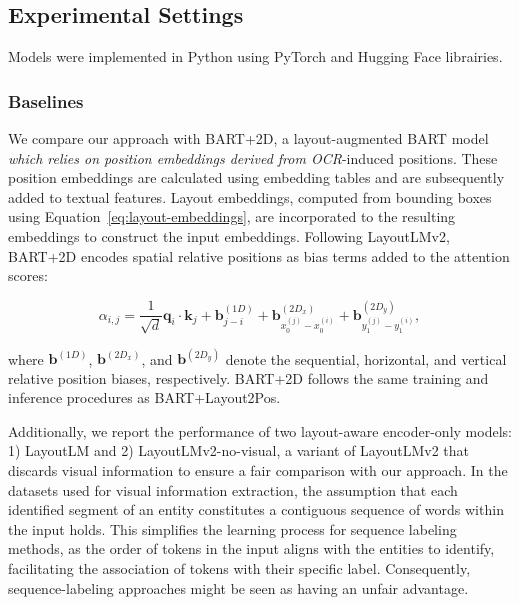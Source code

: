 \subsection{Experimental Settings}

Models were implemented in Python using PyTorch \citep{paszke2017automatic} and Hugging Face \citep{wolf2019huggingface} librairies. 

\subsubsection{Baselines}

We compare our approach with BART+2D, a layout-augmented \ac{BART} model \textit{which relies on position embeddings derived from \ac{OCR}}-induced positions. These position embeddings are calculated using embedding tables \citep{devlin2018bert} and are subsequently added to textual features. Layout embeddings, computed from bounding boxes using Equation~\ref{eq:layout-embeddings}, are incorporated to the resulting embeddings to construct the input embeddings. Following LayoutLMv2, BART+2D encodes spatial relative positions as bias terms added to the attention scores:

\begin{equation}
  \alpha_{i,j} = \dfrac{1}{\sqrt{d}} \bm{q}_i \cdot \bm{k}_j + \bm{b}^{(1D)}_{j - i} + \bm{b}^{(2D_x)}_{x^{(j)}_{0} - x^{(i)}_{0}} + \bm{b}^{(2D_y)}_{y^{(j)}_{1} - y^{(i)}_{1}},
\end{equation}

\noindent where $\bm{b}^{(1D)}$, $\bm{b}^{(2D_x)}$, and $\bm{b}^{(2D_y)}$ denote the sequential, horizontal, and vertical relative position biases, respectively. BART+2D follows the same training and inference procedures as BART+Layout2Pos.

Additionally, we report the performance of two layout-aware encoder-only models: 1) LayoutLM and 2) LayoutLMv2-no-visual, a variant of LayoutLMv2 that discards visual information to ensure a fair comparison with our approach. In the datasets used for visual information extraction, the assumption that each identified segment of an entity constitutes a contiguous sequence of words within the input holds. This simplifies the learning process for sequence labeling methods, as the order of tokens in the input aligns with the entities to identify, facilitating the association of tokens with their specific label. Consequently, sequence-labeling approaches might be seen as having an unfair advantage.

